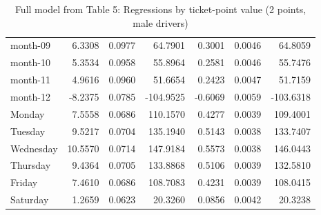 \documentclass[10pt]{article}
\begin{document}
\begin{table}[ht]
\begin{tabular}{lrrrrrr}
  month-09 & 6.3308 & 0.0977 & 64.7901 & 0.3001 & 0.0046 & 64.8059 \\ 
  month-10 & 5.3534 & 0.0958 & 55.8964 & 0.2581 & 0.0046 & 55.7476 \\ 
  month-11 & 4.9616 & 0.0960 & 51.6654 & 0.2423 & 0.0047 & 51.7159 \\ 
  month-12 & -8.2375 & 0.0785 & -104.9525 & -0.6069 & 0.0059 & -103.6318 \\ 
  Monday & 7.5558 & 0.0686 & 110.1570 & 0.4277 & 0.0039 & 109.4001 \\ 
  Tuesday & 9.5217 & 0.0704 & 135.1940 & 0.5143 & 0.0038 & 133.7407 \\ 
  Wednesday & 10.5570 & 0.0714 & 147.9184 & 0.5573 & 0.0038 & 146.0443 \\ 
  Thursday & 9.4364 & 0.0705 & 133.8868 & 0.5106 & 0.0039 & 132.5810 \\ 
  Friday & 7.4610 & 0.0686 & 108.7083 & 0.4231 & 0.0039 & 108.0415 \\ 
  Saturday & 1.2659 & 0.0623 & 20.3260 & 0.0856 & 0.0042 & 20.3238 \\ 
   \hline
\end{tabular}
\caption{Full model from Table 5: Regressions by ticket-point value (2 points, male drivers)} 
\label{tab_5_2_pts_no_age_M}
\end{table}


\clearpage
\pagebreak



\end{document}
